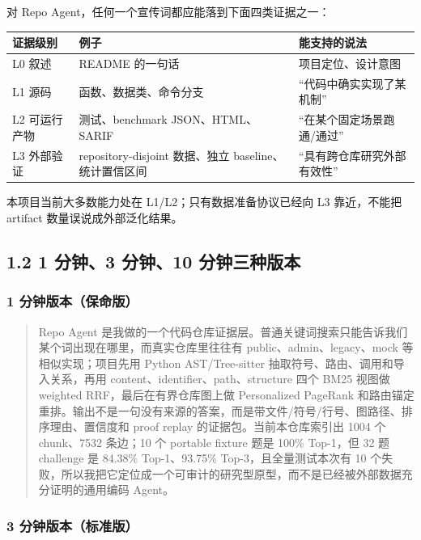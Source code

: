 \documentclass[UTF8,12pt,openany]{ctexbook}
\begin{document}
对 Repo Agent，任何一个宣传词都应能落到下面四类证据之一：\par

\begin{center}
\small
\begin{longtable}{|p{}|p{}|p{}|}
\toprule
证据级别 & 例子 & 能支持的说法 \\
\midrule
L0 叙述 & README 的一句话 & 项目定位、设计意图 \\
L1 源码 & 函数、数据类、命令分支 & “代码中确实实现了某机制” \\
L2 可运行产物 & 测试、benchmark JSON、HTML、SARIF & “在某个固定场景跑通/通过” \\
L3 外部验证 & repository-disjoint 数据、独立 baseline、统计置信区间 & “具有跨仓库研究外部有效性” \\
\bottomrule
\end{longtable}
\end{center}

本项目当前大多数能力处在 L1/L2；只有数据准备协议已经向 L3 靠近，不能把 artifact 数量误说成外部泛化结果。\par

\subsection{1.2 1 分钟、3 分钟、10 分钟三种版本}

\subsubsection{1 分钟版本（保命版）}

\begin{quote}
Repo Agent 是我做的一个代码仓库证据层。普通关键词搜索只能告诉我们某个词出现在哪里，而真实仓库里往往有 public、admin、legacy、mock 等相似实现；项目先用 Python AST/Tree-sitter 抽取符号、路由、调用和导入关系，再用 content、identifier、path、structure 四个 BM25 视图做 weighted RRF，最后在有界仓库图上做 Personalized PageRank 和路由锚定重排。输出不是一句没有来源的答案，而是带文件/符号/行号、图路径、排序理由、置信度和 proof replay 的证据包。当前本仓库索引出 1004 个 chunk、7532 条边；10 个 portable fixture 题是 100\% Top-1，但 32 题 challenge 是 84.38\% Top-1、93.75\% Top-3，且全量测试本次有 10 个失败，所以我把它定位成一个可审计的研究型原型，而不是已经被外部数据充分证明的通用编码 Agent。
\end{quote}

\subsubsection{3 分钟版本（标准版）}
\end{document}
